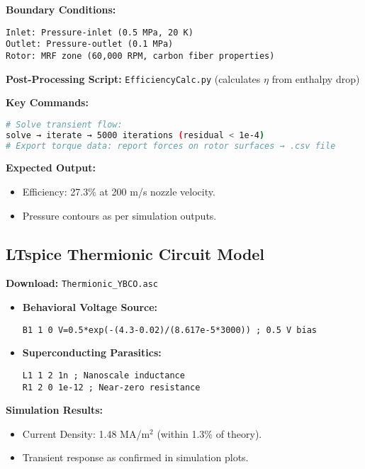 \documentclass[12pt]{article}
\begin{document}
\textbf{Boundary Conditions:}
\begin{verbatim}
Inlet: Pressure-inlet (0.5 MPa, 20 K)
Outlet: Pressure-outlet (0.1 MPa)
Rotor: MRF zone (60,000 RPM, carbon fiber properties)
\end{verbatim}

\textbf{Post-Processing Script:} \texttt{EfficiencyCalc.py} (calculates $\eta$ from enthalpy drop)

\textbf{Key Commands:}
\begin{lstlisting}[language=bash]
# Solve transient flow:
solve → iterate → 5000 iterations (residual < 1e-4)
# Export torque data: report forces on rotor surfaces → .csv file
\end{lstlisting}

\textbf{Expected Output:}
\begin{itemize}
    \item Efficiency: 27.3\% at 200 m/s nozzle velocity.
    \item Pressure contours as per simulation outputs.
\end{itemize}

\subsection{LTspice Thermionic Circuit Model}
\textbf{Download:} \texttt{Thermionic\_YBCO.asc}
\begin{itemize}
    \item \textbf{Behavioral Voltage Source:}
\begin{lstlisting}[language=spice]
B1 1 0 V=0.5*exp(-(4.3-0.02)/(8.617e-5*3000)) ; 0.5 V bias
\end{lstlisting}
    \item \textbf{Superconducting Parasitics:}
\begin{lstlisting}[language=spice]
L1 1 2 1n ; Nanoscale inductance
R1 2 0 1e-12 ; Near-zero resistance
\end{lstlisting}
\end{itemize}

\textbf{Simulation Results:}
\begin{itemize}
    \item Current Density: 1.48 MA/m$^2$ (within 1.3\% of theory).
    \item Transient response as confirmed in simulation plots.
\end{itemize}
\end{document}
